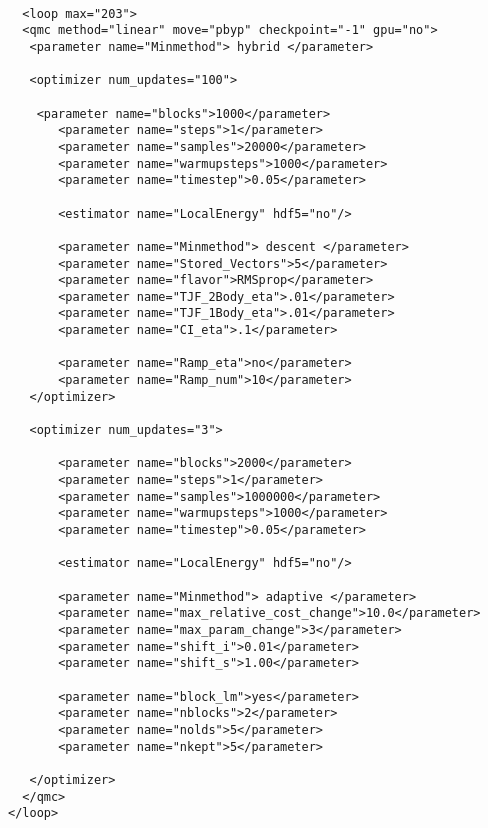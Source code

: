 \begin{lstlisting}[style=QMCPXML]
  
  <loop max="203">
  <qmc method="linear" move="pbyp" checkpoint="-1" gpu="no">
   <parameter name="Minmethod"> hybrid </parameter>

   <optimizer num_updates="100">

	<parameter name="blocks">1000</parameter>
       <parameter name="steps">1</parameter>
       <parameter name="samples">20000</parameter>
       <parameter name="warmupsteps">1000</parameter>
       <parameter name="timestep">0.05</parameter>
       
       <estimator name="LocalEnergy" hdf5="no"/>
       
       <parameter name="Minmethod"> descent </parameter>
       <parameter name="Stored_Vectors">5</parameter>
       <parameter name="flavor">RMSprop</parameter>
       <parameter name="TJF_2Body_eta">.01</parameter>
       <parameter name="TJF_1Body_eta">.01</parameter>
       <parameter name="CI_eta">.1</parameter>

       <parameter name="Ramp_eta">no</parameter>
       <parameter name="Ramp_num">10</parameter>
   </optimizer>

   <optimizer num_updates="3">
       
       <parameter name="blocks">2000</parameter>
       <parameter name="steps">1</parameter>
       <parameter name="samples">1000000</parameter>
       <parameter name="warmupsteps">1000</parameter>
       <parameter name="timestep">0.05</parameter>
       
       <estimator name="LocalEnergy" hdf5="no"/>
       
       <parameter name="Minmethod"> adaptive </parameter>
       <parameter name="max_relative_cost_change">10.0</parameter>
       <parameter name="max_param_change">3</parameter>
       <parameter name="shift_i">0.01</parameter>
       <parameter name="shift_s">1.00</parameter>

       <parameter name="block_lm">yes</parameter>
       <parameter name="nblocks">2</parameter>
       <parameter name="nolds">5</parameter>
       <parameter name="nkept">5</parameter>

   </optimizer>
  </qmc>
</loop>
 \end{lstlisting}

